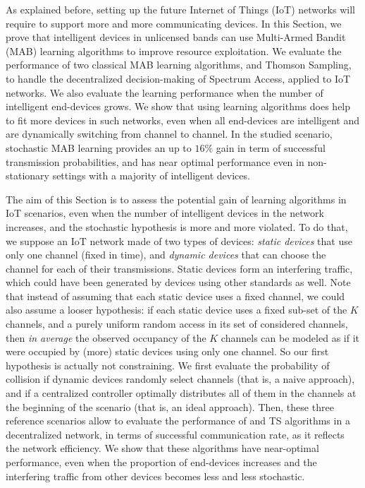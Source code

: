 
\graphicspath{{2-Chapters/4-Chapter/CrownCom_17.git/}}

As explained before, setting up the future Internet of Things (IoT) networks will require to support more and more communicating devices.
In this Section, we prove that intelligent devices in unlicensed bands can use Multi-Armed Bandit (MAB) learning algorithms to improve resource exploitation.
%
We evaluate the performance of two classical MAB learning algorithms, \UCB{} and Thomson Sampling, to handle the decentralized decision-making of Spectrum Access, applied to IoT networks. We also evaluate the learning performance when the number of intelligent end-devices grows.
%
We show that using learning algorithms does help to fit more devices in such networks, even when all end-devices are intelligent and are dynamically switching from channel to channel.
In the studied scenario, stochastic MAB learning provides an up to $16\%$ gain in term of successful transmission probabilities, and has near optimal performance even in non-stationary settings with a majority of intelligent devices.



The aim of this Section is to assess the potential gain of learning algorithms in IoT scenarios, even when the number of intelligent devices in the network increases, and the stochastic hypothesis is more and more violated.
To do that, we suppose an IoT network made of two types of devices: \emph{static devices} that use only one channel (fixed in time), and \emph{dynamic devices} that can choose the channel for each of their transmissions. Static devices form an interfering traffic, which could have been generated by devices using other standards as well.
Note that instead of assuming that each static device uses a fixed channel, we could also assume a looser hypothesis: if each static device uses a fixed sub-set of the $K$ channels, and a purely uniform random access in its set of considered channels, then \emph{in average} the observed occupancy of the $K$ channels can be modeled as if it were occupied by (more) static devices using only one channel. So our first hypothesis is actually not constraining.
We first evaluate the probability of collision if dynamic devices randomly select channels (that is, a naive approach), and if a centralized controller optimally distributes all of them in the channels at the beginning of the scenario (that is, an ideal approach).
Then, these three reference scenarios allow to evaluate the performance of \UCB{} and TS algorithms in a decentralized network, in terms of successful communication rate, as it reflects the network efficiency.
We show that these algorithms have near-optimal performance, even when the proportion of end-devices increases and the interfering traffic from other devices becomes less and less stochastic.


